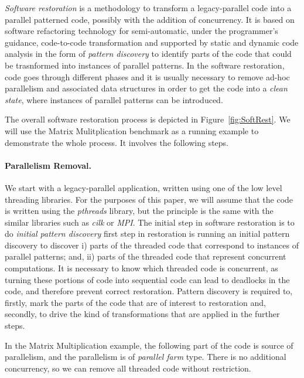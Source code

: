 \documentclass{llncs}
\begin{document}
\emph{Software restoration} is a methodology to transform a legacy-parallel code into a parallel patterned code, possibly with the addition of concurrency. It is based on software refactoring technology for semi-automatic, under the programmer's guidance, code-to-code transformation and supported by static and dynamic code analysis in the form of \emph{pattern discovery} to identify parts of the code that could be trasnformed into instances of parallel patterns. In the software restoration, code goes through different phases and it is usually necessary to remove ad-hoc parallelism and associated data structures in order to get the code into a \emph{clean state}, where instances of parallel patterns can be introduced. 

The overall software restoration process is depicted in Figure~\ref{fig:SoftRest}. We will use the Matrix Mulitplication benchmark as a running example to demonstrate the whole process. It involves the following steps.

\paragraph{Parallelism Removal.}
We start with a legacy-parallel application, written using one of the low level threading libraries. For the purposes of this paper, we will assume that the code is written using the \emph{pthreads} library, but the principle is the same with the similar libraries such as \emph{cilk} or \emph{MPI}. The initial step in software restoration is to do \emph{initial pattern discovery} first step in restoration is running an initial pattern discovery to discover i) parts of the threaded code that correspond to instances of parallel patterns; and, ii) parts of the threaded code that represent concurrent computations. It is necessary to know which threaded code is concurrent, as turning these portions of code into sequential code can lead to deadlocks in the code, and therefore prevent correct restoration. Pattern discovery is required to, firstly, mark the parts of the code that are of interest to restoration and, secondly, to drive the kind of transformations that are applied in the further steps.

In the Matrix Multiplication example, the following part of the code is source of parallelism, and the parallelism is of \emph{parallel farm} type. There is no additional concurrency, so we can remove all threaded code without restriction.
\end{document}
